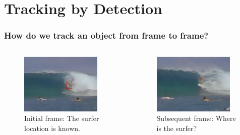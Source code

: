 \section{Tracking by Detection}

\begin{frame}
    \frametitle{How do we track an object from frame to frame?}
    \begin{columns}[T]
        \begin{column}{0.5\textwidth}
            \begin{figure}
                \includegraphics[width=0.9\textwidth]{surfer_marked}
                \caption{Initial frame: The surfer location is known.}
            \end{figure}
        \end{column}
        \begin{column}{0.5\textwidth}
            \begin{figure}
                \includegraphics[width=0.9\textwidth]{surfer_unmarked}
                \caption{Subsequent frame: Where is the surfer?}
            \end{figure}
        \end{column}
    \end{columns}
\end{frame}

